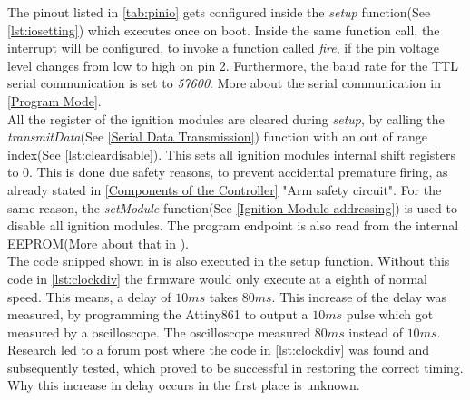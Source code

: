 \noindent The pinout listed in \cref{tab:pinio} gets configured inside the \textit{setup} function(See \cref{lst:iosetting}) which executes once on boot. Inside the same function call, the interrupt will be configured, to invoke a function called \textit{fire}, if the pin voltage level changes from low to high on pin 2.  Furthermore, the baud rate for the TTL serial communication is set to \textit{57600}. More about the serial communication in \cref{Program Mode}.\\



\noindent All the register of the ignition modules are cleared during \textit{setup}, by calling the \textit{transmitData}(See \cref{Serial Data Transmission}) function with an out of range index(See \cref{lst:cleardisable}). This sets all ignition modules internal shift registers to 0. This is done due safety reasons, to prevent accidental premature firing, as already stated in \cref{Components of the Controller} "Arm safety circuit". For the same reason, the \textit{setModule} function(See \cref{Ignition Module addressing}) is used to disable all ignition modules. The program endpoint is also read from the internal EEPROM(More about that in ).\\



\noindent The code snipped shown in  is also executed in the setup function. Without this code in \cref{lst:clockdiv} the firmware would only execute at a eighth of normal speed. This means, a delay of $10ms$ takes $80ms$. This increase of the delay was measured, by programming the Attiny861 to output a $10ms$ pulse which got measured by a oscilloscope. The oscilloscope measured $80ms$ instead of $10ms$. Research led to a forum post where the code in \cref{lst:clockdiv} was found and subsequently tested, which proved to be successful in restoring the correct timing. Why this increase in delay occurs in the first place is unknown.



